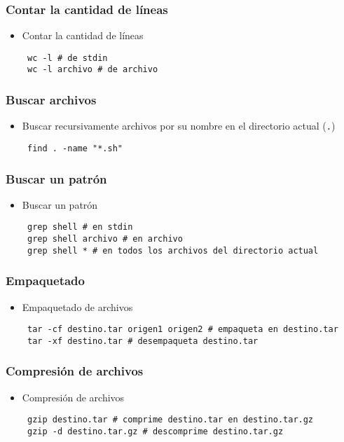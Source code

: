 \begin{frame}[fragile]
  \frametitle{Contar la cantidad de líneas}
  \begin{itemize}
    \item Contar la cantidad de líneas
   \begin{lstlisting}
 wc -l # de stdin
 wc -l archivo # de archivo
   \end{lstlisting}
  \end{itemize}
\end{frame}

\begin{frame}[fragile]
  \frametitle{Buscar archivos}
  \begin{itemize}
    \item Buscar recursivamente archivos por su nombre en el directorio actual (\texttt{.})
   \begin{lstlisting}
 find . -name "*.sh"
   \end{lstlisting}
  \end{itemize}
\end{frame}

\begin{frame}[fragile]
  \frametitle{Buscar un patrón}
  \begin{itemize}
    \item Buscar un patrón
   \begin{lstlisting}
 grep shell # en stdin
 grep shell archivo # en archivo
 grep shell * # en todos los archivos del directorio actual
   \end{lstlisting}
  \end{itemize}
\end{frame}

\begin{frame}[fragile]
  \frametitle{Empaquetado}
  \begin{itemize}
    \item Empaquetado de archivos
   \begin{lstlisting}
 tar -cf destino.tar origen1 origen2 # empaqueta en destino.tar
 tar -xf destino.tar # desempaqueta destino.tar
   \end{lstlisting}
  \end{itemize}
\end{frame}

\begin{frame}[fragile]
  \frametitle{Compresión de archivos}
  \begin{itemize}
    \item Compresión de archivos
   \begin{lstlisting}
 gzip destino.tar # comprime destino.tar en destino.tar.gz
 gzip -d destino.tar.gz # descomprime destino.tar.gz
   \end{lstlisting}
  \end{itemize}
\end{frame}

